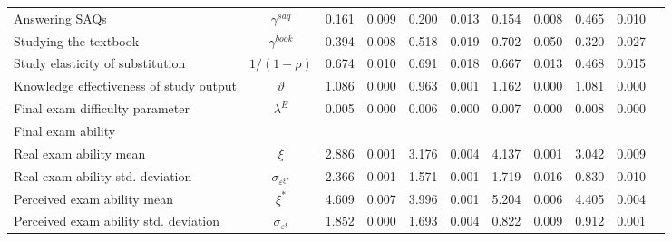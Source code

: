 \documentclass[12pt]{article}
\begin{document}
\begin{landscape}
\begin{table}[htbp]
\begin{tabular}{lcccccccccc}
                       \hspace{0.4cm}Answering SAQs &                 $\gamma^{saq}$ & 0.161 & 0.009 & 0.200 & 0.013 & 0.154 & 0.008 &  0.465 & 0.010 \\
                \hspace{0.4cm}Studying the textbook &                $\gamma^{book}$ & 0.394 & 0.008 & 0.518 & 0.019 & 0.702 & 0.050 &  0.320 & 0.027 \\
                   Study elasticity of substitution &                   $1/(1-\rho)$ & 0.674 & 0.010 & 0.691 & 0.018 & 0.667 & 0.013 &  0.468 & 0.015 \\
            Knowledge effectiveness of study output &                    $\vartheta$ & 1.086 & 0.000 & 0.963 & 0.001 & 1.162 & 0.000 &  1.081 & 0.000 \\
                    Final exam difficulty parameter &                    $\lambda^E$ & 0.005 & 0.000 & 0.006 & 0.000 & 0.007 & 0.000 &  0.008 & 0.000 \\
               \hline
Final exam ability & & & & & & & & & \\
\hspace{0.4cm}Real exam ability mean &                          $\xi$ & 2.886 & 0.001 & 3.176 & 0.004 & 4.137 & 0.001 &  3.042 & 0.009 \\
     \hspace{0.4cm}Real exam ability std. deviation & $\sigma_{\varepsilon^\xi{^*}}$ & 2.366 & 0.001 & 1.571 & 0.001 & 1.719 & 0.016 &  0.830 & 0.010 \\
          \hspace{0.4cm}Perceived exam ability mean &                        $\xi^*$ & 4.609 & 0.007 & 3.996 & 0.001 & 5.204 & 0.006 &  4.405 & 0.004 \\
\hspace{0.4cm}Perceived exam ability std. deviation &     $\sigma_{\varepsilon^\xi}$ & 1.852 & 0.000 & 1.693 & 0.004 & 0.822 & 0.009 &  0.912 & 0.001 \\
\hline
\hline
\end{tabular}
\end{table}
\end{landscape}
\end{document}
